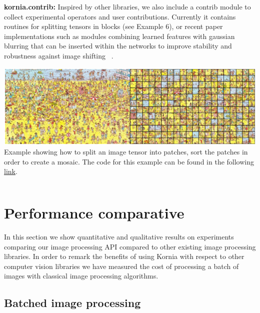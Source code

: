 \noindent\textbf{kornia.contrib:} Inspired by other libraries, we also include a  contrib module  to collect experimental operators and user contributions. Currently it contains routines for splitting tensors in blocks (see Example 6), or recent paper implementations such as modules combining learned features with gaussian blurring that can be inserted within the networks to improve stability and robustness against image shifting ~\citep{zhang2019shiftinvar}.

\begin{tcolorbox}[every float=\centering, drop shadow, title=Example 6: Extract image patches]
    \label{fig:examples:contrib}
    \includegraphics[width=1.\linewidth]{main/chapter03/data/examples/wally_patches.jpg}
    {Example showing how to split an image tensor into patches, sort the patches in order to create a mosaic. The code for this example can be found in the following \underline{\color{blue}\href{https://colab.research.google.com/drive/1JEPVShMILiFd4VfbJ5P3qTrqajSfR0Xv}{link}}.}
    \inputminted[python3, baselinestretch=1., style=vs, fontfamily=courier, fontsize=\footnotesize, funcnamehighlighting=true]{python}{main/chapter03/data/examples/snipet_contrib.py}
\end{tcolorbox}

\section{Performance comparative}

In this section we show quantitative and qualitative results on experiments comparing our image processing API compared to other existing image processing libraries. In order to remark the benefits of using Kornia with respect to other computer vision libraries we have measured the cost of processing a batch of images with classical image processing algorithms.

\subsection{Batched image processing}
\label{section:use_cases:imgproc}

